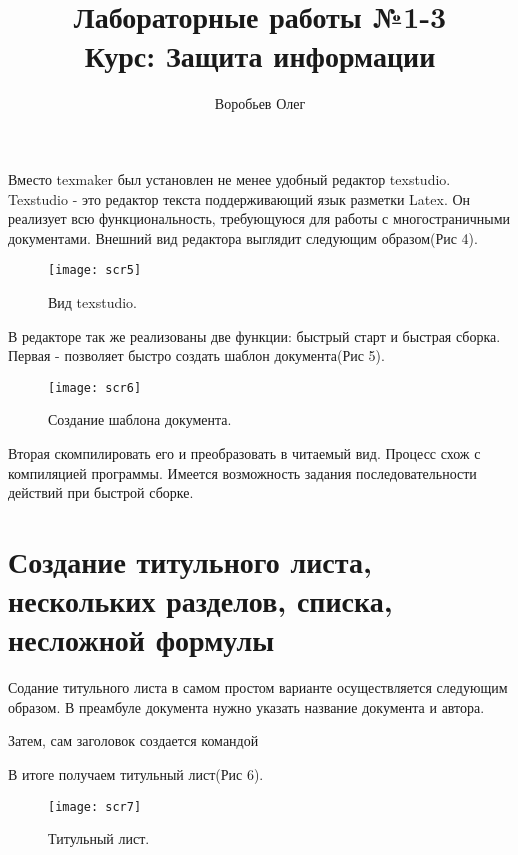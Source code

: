 \documentclass{article}
\begin{document}
Вместо texmaker был установлен не менее удобный редактор texstudio. Texstudio - это редактор текста поддерживающий язык разметки Latex. Он реализует всю функциональность, требующуюся для работы с многостраничными документами. Внешний вид редактора выглядит следующим образом(Рис 4).
\begin{figure}
	\center
	\texttt{[image: scr5]}
	\caption{Вид texstudio.}
\end{figure}

В редакторе так же реализованы две функции: быстрый старт и быстрая сборка. Первая - позволяет быстро создать шаблон документа(Рис 5).
\begin{figure}
	\center
	\texttt{[image: scr6]}
	\caption{Создание шаблона документа.}
\end{figure}

Вторая скомпилировать его и преобразовать в читаемый вид. Процесс схож с компиляцией программы. Имеется возможность задания последовательности действий при быстрой сборке.



\section[4]{Создание титульного листа, нескольких разделов, списка, несложной формулы}

Содание титульного листа в самом простом варианте осуществляется следующим образом.
В преамбуле документа нужно указать название документа и автора.
\begin{verbatim*}
	\title{Лабораторные работы №1-3 \\ Курс: Защита информации}
	\author{Воробьев Олег}	
\end{verbatim*}
Затем, сам заголовок создается командой
\begin{verbatim*}
	\maketitle
\end{verbatim*}

В итоге получаем титульный лист(Рис 6).
\begin{figure}
	\center
	\texttt{[image: scr7]}
	\caption{Титульный лист.}
\end{figure}
\end{document}
